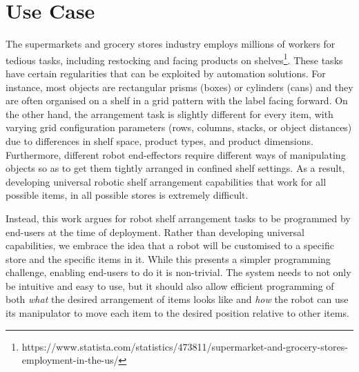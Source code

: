 \section{Use Case}\label{sec:irosintro}
The supermarkets and grocery stores industry employs millions of workers for tedious tasks, including restocking and facing products on shelves\footnote{https://www.statista.com/statistics/473811/supermarket-and-grocery-stores-employment-in-the-us/}.
These tasks have certain regularities that can be exploited by automation solutions.
For instance, most objects are rectangular prisms (boxes) or cylinders (cans) and they are often organised on a shelf in a grid pattern with the label facing forward.
On the other hand, the arrangement task is slightly different for every item, with varying grid configuration parameters (rows, columns, stacks, or object distances) due to differences in shelf space, product types, and product dimensions.
Furthermore, different robot end-effectors require different ways of manipulating objects so as to get them tightly arranged in confined shelf settings.
As a result, developing universal robotic shelf arrangement capabilities that work for all possible items, in all possible stores is extremely difficult.

Instead, this work argues for robot shelf arrangement tasks to be programmed by end-users at the time of deployment.
Rather than developing universal capabilities, we embrace the idea that a robot will be customised to a specific store and the specific items in it.
While this presents a simpler programming challenge, enabling end-users to do it is non-trivial.
The system needs to not only be intuitive and easy to use, but it should also allow efficient programming of both {\em what} the desired arrangement of items looks like and {\em how} the robot can use its manipulator to move each item to the desired position relative to other items.


